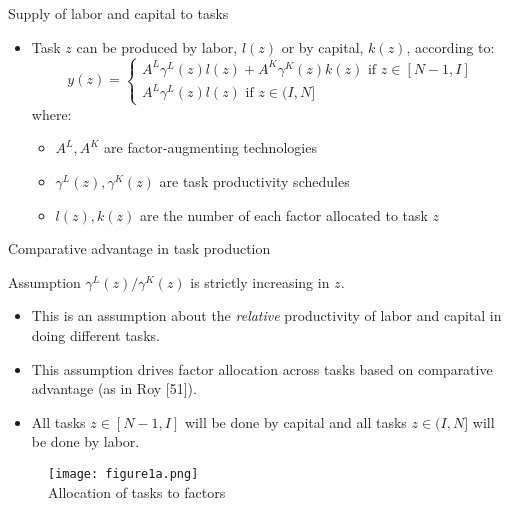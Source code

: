 \documentclass[notes=show]{beamer}
\begin{document}
\begin{frame}{Supply of labor and capital to tasks}
\begin{itemize}
\item Task $z$ can be produced by labor, $l(z)$ or by capital, $k(z)$, according to:
\[
y(z) = 
\begin{cases}
A^{L} \gamma^{L}(z)l(z) + A^{K} \gamma^{K}(z)k(z) \text{ if } z \in [N-1,I]\\
A^{L} \gamma^{L}(z)l(z) \text{ if } z \in (I,N] 
\end{cases}
\]
where:
\begin{itemize}
\item $A^{L}, A^{K}$ are factor-augmenting technologies \medskip
\item $ \gamma^{L}(z), \gamma^{K}(z)$ are task productivity schedules \medskip
\item $ l(z), k(z)$ are the number of each factor allocated to task $z$
\end{itemize}
\end{itemize}
\end{frame}

\begin{frame}{Comparative advantage in task production}
\begin{block}{Assumption}
$ \gamma^{L}(z)/\gamma^{K}(z)$ is strictly increasing in $z$.
\end{block}
\begin{itemize}
\item This is an assumption about the \textit{relative} productivity of labor and capital in doing different tasks. \medskip
\item This assumption drives factor allocation across tasks based on comparative advantage (as in Roy [51]).\medskip
\item All tasks $z \in [N-1,I]$ will be done by capital and all tasks $z \in (I,N]$ will be done by labor. 
\end{itemize}
\end{frame}

\newpage
\begin{center}
\begin{figure}
\texttt{[image: figure1a.png]}
\\ Allocation of tasks to factors
\end{figure} 
\end{center}
\newpage
\end{document}
